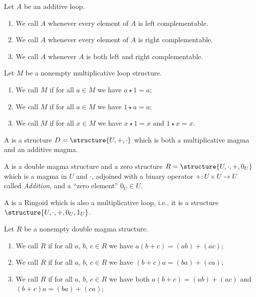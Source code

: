 \begin{definition}
Let $A$ be an additive loop.
\begin{enumerate}
\item{} We call $A$  whenever every element of $A$ is left complementable.
\item{} We call $A$  whenever every element of $A$ is right complementable.
\item{} We call $A$ 
  whenever $A$ is both left and right complementable.
\end{enumerate}
\end{definition}

\begin{definition}\label{defn:loop:unital}
Let $M$ be a nonempty multiplicative loop structure.
\begin{enumerate}
\item{} We call $M$  if
  for all $a\in M$ we have $a\star1=a$;
\item{} We call $M$  if
  for all $a\in M$ we have $1\star a=a$;
\item{} We call $M$  if for all
  $x\in M$ we have $x\star 1=x$ and $1\star x=x$.
\end{enumerate}
\end{definition}

\begin{definition}
A  is a structure $D=\structure{U,+,\cdot}$
which is both a multiplicative magma and an additive magma.

A  
is a double magma structure and a zero structure $R=\structure{U,\cdot,+,0_{U}}$ which is
a magma in $U$ and $\cdot$, adjoined with a binary operator $+\colon U\times U\to U$
called \emph{Addition},
and a ``zero element'' $0_{U}\in U$.

A  is a Ringoid which is also a multiplicative
loop, i.e., it is a structure $\structure{U,\cdot,+,0_{U},1_{U}}$. 
\end{definition}

\begin{definition}\label{defn:double-loop:distributive}
Let $R$ be a nonempty double  magma structure.
\begin{enumerate}
\item{} We call $R$  if
  for all $a$, $b$, $c\in R$ we have $a(b+c)=(ab)+(ac)$;
\item{} We call $R$  if
  for all $a$, $b$, $c\in R$ we have $(b+c)a=(ba)+(ca)$;
\item{} We call $R$  if for all
  $a$, $b$, $c\in R$ we have both $a(b+c)=(ab)+(ac)$ and $(b+c)a=(ba)+(ca)$;
\end{enumerate}
\end{definition}

